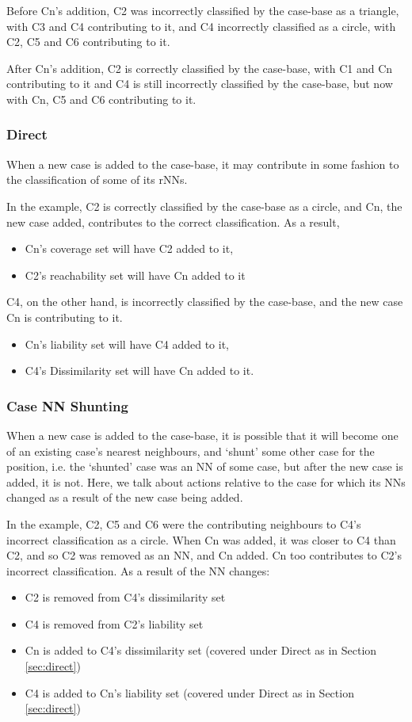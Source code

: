 \documentclass[a4paper,11pt]{report}
\begin{document}
Before Cn's addition, C2 was incorrectly classified by the case-base as a triangle, with C3 and C4 contributing to it, and C4 incorrectly classified as a circle, with C2, C5 and C6 contributing to it.

After Cn's addition, C2 is correctly classified by the case-base, with C1 and Cn contributing to it and C4 is still incorrectly classified by the case-base, but now with Cn, C5 and C6 contributing to it.

\subsubsection{Direct\label{sec:direct}}
When a new case is added to the case-base, it may contribute in some fashion to the classification of some of its rNNs.

In the example, C2 is correctly classified by the case-base as a circle, and Cn, the new case added, contributes to the correct classification. As a result,
\begin{itemize}
	\item Cn's coverage set will have C2 added to it, 
	\item C2's reachability set will have Cn added to it
\end{itemize}

C4, on the other hand, is incorrectly classified by the case-base, and the new case Cn is contributing to it.
\begin{itemize}
	\item Cn's liability set will have C4 added to it,
	\item C4's Dissimilarity set will have Cn added to it.
\end{itemize}

\subsubsection{Case NN Shunting}
When a new case is added to the case-base, it is possible that it will become one of an existing case's nearest neighbours, and `shunt' some other case for the position, i.e. the `shunted' case was an NN of some case, but after the new case is added, it is not. Here, we talk about actions relative to the case for which its NNs changed as a result of the new case being added.

In the example, C2, C5 and C6 were the contributing neighbours to C4's incorrect classification as a circle. When Cn was added, it was closer to C4 than C2, and so C2 was removed as an NN, and Cn added. Cn too contributes to C2's incorrect classification.  As a result of the NN changes: 
\begin{itemize}
	\item C2 is removed from C4's dissimilarity set  
	\item C4 is removed from C2's liability set
	\item Cn is added to C4's dissimilarity set (covered under Direct as in Section \ref{sec:direct})
	\item C4 is added to Cn's liability set (covered under Direct as in Section \ref{sec:direct})
\end{itemize}
\end{document}
